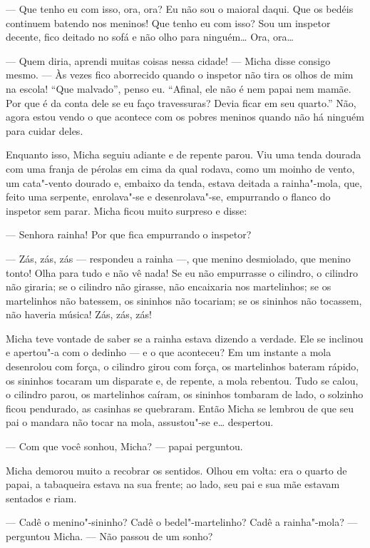 --- Que tenho eu com isso, ora, ora? Eu não sou o maioral daqui. Que os
bedéis continuem batendo nos meninos! Que tenho eu com isso? Sou um
inspetor decente, fico deitado no sofá e não olho para ninguém\ldots{} Ora,
ora\ldots{}

--- Quem diria, aprendi muitas coisas nessa cidade! --- Micha disse
consigo mesmo. --- Às vezes fico aborrecido quando o inspetor não tira
os olhos de mim na escola! ``Que malvado'', penso eu. ``Afinal, ele não
é nem papai nem mamãe. Por que é da conta dele se eu faço travessuras?
Devia ficar em seu quarto.'' Não, agora estou vendo o que acontece com
os pobres meninos quando não há ninguém para cuidar deles.

Enquanto isso, Micha seguiu adiante e de repente parou. Viu uma tenda
dourada com uma franja de pérolas em cima da qual rodava, como um moinho
de vento, um cata"-vento dourado e, embaixo da tenda, estava deitada a
rainha"-mola, que, feito uma serpente, enrolava"-se e desenrolava"-se,
empurrando o flanco do inspetor sem parar. Micha ficou muito surpreso e
disse:

--- Senhora rainha! Por que fica empurrando o inspetor?

--- Zás, zás, zás --- respondeu a rainha ---, que menino desmiolado, que
menino tonto! Olha para tudo e não vê nada! Se eu não empurrasse o
cilindro, o cilindro não giraria; se o cilindro não girasse, não
encaixaria nos martelinhos; se os martelinhos não batessem, os sininhos
não tocariam; se os sininhos não tocassem, não haveria música! Zás, zás,
zás!

Micha teve vontade de saber se a rainha estava dizendo a verdade. Ele se
inclinou e apertou"-a com o dedinho --- e o que aconteceu? Em um instante
a mola desenrolou com força, o cilindro girou com força, os martelinhos
bateram rápido, os sininhos tocaram um disparate e, de repente, a mola
rebentou. Tudo se calou, o cilindro parou, os martelinhos caíram, os
sininhos tombaram de lado, o solzinho ficou pendurado, as casinhas se
quebraram. Então Micha se lembrou de que seu pai o mandara não tocar na
mola, assustou"-se e\ldots{} despertou.

--- Com que você sonhou, Micha? --- papai perguntou.

Micha demorou muito a recobrar os sentidos. Olhou em volta: era o quarto
de papai, a tabaqueira estava na sua frente; ao lado, seu pai e sua mãe
estavam sentados e riam.

--- Cadê o menino"-sininho? Cadê o bedel"-martelinho? Cadê a rainha"-mola?
--- perguntou Micha. --- Não passou de um sonho?

